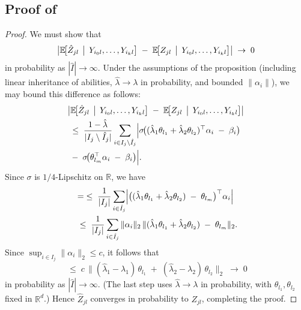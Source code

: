 \subsection{Proof of } \label{proof:prop-estimator-unbiased}
%
\begin{proof}
We must show that 
\[
\bigl\lvert
  \mathbb{E}\!\bigl[\hat{Z}_{jl} \,\bigm|\,
    Y_{i_0l},\dots,Y_{i_kl}
  \bigr]
  \;-\;
  \mathbb{E}\!\bigl[Z_{jl} \,\bigm|\,
    Y_{i_0l},\dots,Y_{i_kl}
  \bigr]
\bigr\rvert
\;\to\;0
\]
in probability as
$|\hat{I}|\to\infty$.
Under the assumptions of the proposition (including linear inheritance of abilities, 
\(\hat{\lambda}\to\lambda\) in probability, and bounded \(\|\alpha_i\|\)), 
we may bound this difference as follows:
\begin{align*}
&\bigl\lvert
  \mathbb{E}\!\bigl[\hat{Z}_{jl} \, \bigm|\,
    Y_{i_0l}, \ldots, Y_{i_kl}
  \bigr]
  \;-\;
  \mathbb{E}\!\bigl[Z_{jl} \,\bigm|\,
    Y_{i_0l}, \ldots, Y_{i_kl}
  \bigr]
\bigr\rvert\\
&\;\le\;
\frac{1 - \hat{\lambda}}{|I_j \setminus \hat{I}_j|}
\sum_{i \in I_j \setminus \hat{I}_j}
\Bigl|
  \sigma\!\bigl((\hat{\lambda}_1\theta_{l_1}
    +\hat{\lambda}_2\theta_{l_2})^\top \alpha_i 
    \;-\;\beta_i\bigr)\\
  &\;-\;
  \sigma\!\bigl(\theta_{l_m}^\top \alpha_i 
    \;-\;\beta_i\bigr)
\Bigr|.
\end{align*}
Since \(\sigma\) is \(1/4\)-Lipschitz on \(\mathbb{R}\), we have
\begin{align*}
    &= \;\le\;
    \frac{1}{|I_j|}
    \sum_{i \in \hat{I}_j}
    \Bigl|
      \bigl(
        (\hat{\lambda}_1\theta_{l_1}
         +\hat{\lambda}_2\theta_{l_2})
        \;-\;
        \theta_{l_m}
      \bigr)^\top \alpha_i
    \Bigr| \\ 
    &\;\le\;
    \frac{1}{|I_j|}
    \sum_{i \in \hat{I}_j}
    \|\alpha_i\|_2
    \,
    \|(\hat{\lambda}_1\theta_{l_1}
        +\hat{\lambda}_2\theta_{l_2})
      \;-\;\theta_{l_m}\|_2.
\end{align*}
Since \(\sup_{i\in I_j}\|\alpha_i\|_2 \le c\), it follows that
\[
\;\le\;
c\,
\bigl\|
  (\hat{\lambda}_1-\lambda_1)\,\theta_{l_1}
  \;+\;
  (\hat{\lambda}_2-\lambda_2)\,\theta_{l_2}
\bigr\|_2
\;\to\;0
\]
in probability as $|\hat{I}|\to\infty$.
(The last step uses \(\hat{\lambda}\to\lambda\) in probability, with 
\(\theta_{l_1}, \theta_{l_2}\) fixed in \(\mathbb{R}^d\).)  
Hence \(\hat{Z}_{jl}\) converges in probability to \(Z_{jl}\), completing the proof.
\end{proof}


